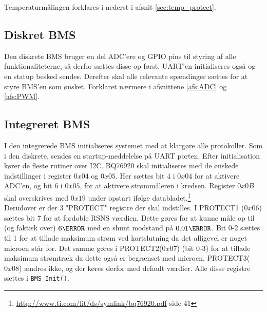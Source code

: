 Temperaturmålingen forklares i nederst i afsnit \ref{sec:temp_protect}.

\subsection{Diskret BMS}
Den diskrete BMS bruger en del ADC'ere og GPIO pins til styring af alle funktionaliteterne, så derfor sættes disse op først. UART'en initialiseres også og en statup besked sendes. Derefter skal alle relevante spændinger sættes for at styre BMS'en som ønsket. Forklaret nærmere i afsnittene \ref{afs:ADC} og \ref{afs:PWM}.

\subsection{Integreret BMS}
I den integrerede BMS initialiseres systemet med at klargøre alle protokoller. Som i den diskrete, sendes en startup-meddelelse på UART porten. Efter initialisation kører de fleste rutiner over I2C. BQ76920 skal initialiseres med de ønskede indstillinger i register $0x04$ og $0x05$. Her sættes bit 4 i $0x04$ for at aktivere ADC'en, og bit 6 i $0x05$, for at aktivere strømmåleren i kredsen. Register $0x0B$ skal overskrives med $0x19$ under opstart ifølge databladet.\footnote{\url{http://www.ti.com/lit/ds/symlink/bq76920.pdf} side 41} \\

Derudover er der 3 "PROTECT" \space registre der skal indstilles. I PROTECT1 ($0x06$) sættes bit 7 for at fordoble RSNS værdien. Dette gøres for at kunne måle op til (og faktisk over) $6\ampere$ med en shunt modstand på $0.01\ohm$. Bit 0-2 sættes til 1 for at tillade maksimum strøm ved kortslutning da det alligevel er noget microen står for. Det samme gøres i PROTECT2($0x07$) (bit 0-3) for at tillade maksimum strømtræk da dette også er begrænset med microen. PROTECT3($0x08$) ændres ikke, og der køres derfor med default værdier. Alle disse registre sættes i \verb|BMS_Init()|.

